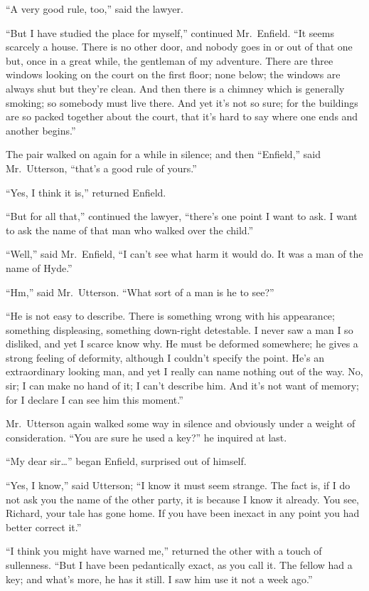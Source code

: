 \documentclass[12pt,openright]{book}
\begin{document}
“A very good rule, too,” said the lawyer.

“But I have studied the place for myself,” continued Mr. Enfield. “It seems scarcely a house. There is no other door, and nobody goes in or out of that one but, once in a great while, the gentleman of my adventure. There are three windows looking on the court on the first floor; none below; the windows are always shut but they’re clean. And then there is a chimney which is generally smoking; so somebody must live there. And yet it’s not so sure; for the buildings are so packed together about the court, that it’s hard to say where one ends and another begins.”

The pair walked on again for a while in silence; and then “Enfield,” said Mr. Utterson, “that’s a good rule of yours.”

“Yes, I think it is,” returned Enfield.

“But for all that,” continued the lawyer, “there’s one point I want to ask. I want to ask the name of that man who walked over the child.”

“Well,” said Mr. Enfield, “I can’t see what harm it would do. It was a man of the name of Hyde.”

“Hm,” said Mr. Utterson. “What sort of a man is he to see?”

“He is not easy to describe. There is something wrong with his appearance; something displeasing, something down-right detestable. I never saw a man I so disliked, and yet I scarce know why. He must be deformed somewhere; he gives a strong feeling of deformity, although I couldn’t specify the point. He’s an extraordinary looking man, and yet I really can name nothing out of the way. No, sir; I can make no hand of it; I can’t describe him. And it’s not want of memory; for I declare I can see him this moment.”

Mr. Utterson again walked some way in silence and obviously under a weight of consideration. “You are sure he used a key?” he inquired at last.

“My dear sir…” began Enfield, surprised out of himself.

“Yes, I know,” said Utterson; “I know it must seem strange. The fact is, if I do not ask you the name of the other party, it is because I know it already. You see, Richard, your tale has gone home. If you have been inexact in any point you had better correct it.”

“I think you might have warned me,” returned the other with a touch of sullenness. “But I have been pedantically exact, as you call it. The fellow had a key; and what’s more, he has it still. I saw him use it not a week ago.”
\end{document}

